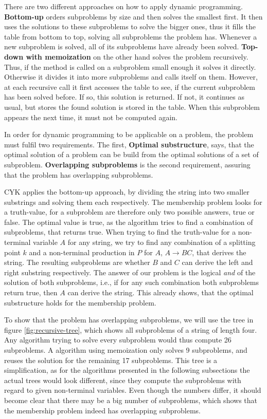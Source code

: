 There are two different approaches on how to apply dynamic programming.
\textbf{Bottom-up} orders subproblems by size and then solves the smallest first.
It then uses the solutions to these subproblems to solve the bigger ones, thus it fills the table from bottom to top, solving all subproblems the problem has.
Whenever a new subproblem is solved, all of its subproblems have already been solved.
\textbf{Top-down with memoization} on the other hand solves the problem recursively.
Thus, if the method is called on a subproblem small enough it solves it directly.
Otherwise it divides it into more subproblems and calls itself on them.
However, at each recursive call it first accesses the table to see, if the current subproblem has been solved before.
If so, this solution is returned.
If not, it continues as usual, but stores the found solution is stored in the table.
When this subproblem appears the next time, it must not be computed again.

In order for dynamic programming to be applicable on a problem, the problem must fulfil two requirements.
The first, \textbf{Optimal substructure}, says, that the optimal solution of a problem can be build from the optimal solutions of a set of subproblem.
\textbf{Overlapping subproblems} is the second requirement, assuring that the problem has overlapping subproblems.

CYK applies the bottom-up approach, by dividing the string into two smaller substrings and solving them each respectively.
The membership problem looks for a truth-value, for a subproblem are therefore only two possible answers, true or false.
The optimal value is true, as the algorithm tries to find a combination of subproblems, that returns true.
When trying to find the truth-value for a non-terminal variable $A$ for any string, we try to find any combination of a splitting point $k$ and a non-terminal production in $P$ for $A$, $A\rightarrow BC$, that derives the string.
The resulting subproblems are whether $B$ and $C$ can derive the left and right substring respectively.
The answer of our problem is the logical \textit{and} of the solution of both subproblems, i.e., if for any such combination both subproblems return true, then $A$ can derive the string.
This already shows, that the optimal substructure holds for the membership problem.



To show that the problem has overlapping subproblems, we will use the tree in figure \ref{fig:recursive-tree}, which shows all subproblems of a string of length four.
Any algorithm trying to solve every subproblem would thus compute 26 subproblems.
A algorithm using memoization only solves 9 subproblems, and reuses the solution for the remaining 17 subproblems.
This tree is a simplification, as for the algorithms presented in the following subsections the actual trees would look different, since they compute the subproblems with regard to given non-terminal variables.
Even though the numbers differ, it should become clear that there may be a big number of subproblems, which shows that the membership problem indeed has overlapping subproblems.

